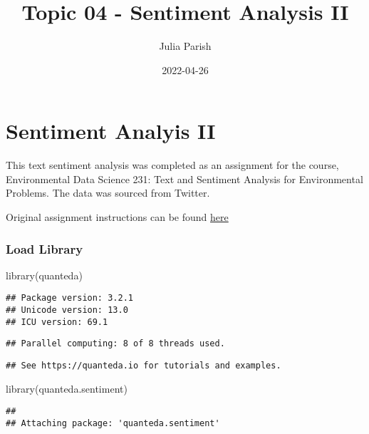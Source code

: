 \documentclass[
]{article}
\title{Topic 04 - Sentiment Analysis II}
\author{Julia Parish}
\date{2022-04-26}
\newenvironment{Shaded}{\begin{snugshade}}{\end{snugshade}}
\newcommand{\FunctionTok}[1]{\textcolor[rgb]{0.00,0.00,0.00}{#1}}
\newcommand{\NormalTok}[1]{#1}
\begin{document}
\maketitle

\hypertarget{sentiment-analyis-ii}{%
\section{Sentiment Analyis II}\label{sentiment-analyis-ii}}

This text sentiment analysis was completed as an assignment for the
course, Environmental Data Science 231: Text and Sentiment Analysis for
Environmental Problems. The data was sourced from Twitter.

Original assignment instructions can be found
\href{https://maro406.github.io/EDS_231-text-sentiment/topic_4.html}{here}

\hypertarget{load-library}{%
\subsubsection{Load Library}\label{load-library}}

\begin{Shaded}
\begin{Highlighting}[]
\FunctionTok{library}\NormalTok{(quanteda)}
\end{Highlighting}
\end{Shaded}

\begin{verbatim}
## Package version: 3.2.1
## Unicode version: 13.0
## ICU version: 69.1
\end{verbatim}

\begin{verbatim}
## Parallel computing: 8 of 8 threads used.
\end{verbatim}

\begin{verbatim}
## See https://quanteda.io for tutorials and examples.
\end{verbatim}

\begin{Shaded}
\begin{Highlighting}[]
\FunctionTok{library}\NormalTok{(quanteda.sentiment)}
\end{Highlighting}
\end{Shaded}

\begin{verbatim}
## 
## Attaching package: 'quanteda.sentiment'
\end{verbatim}
\end{document}
